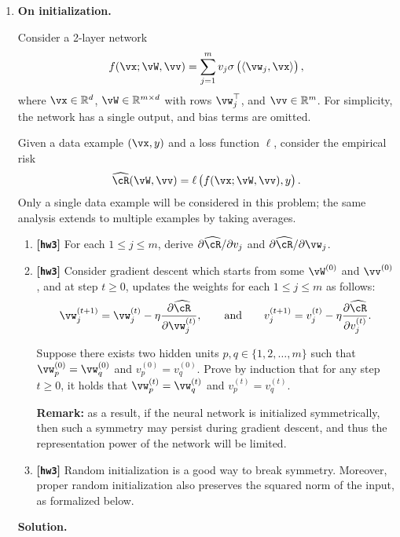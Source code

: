 \documentclass{article}
\def\hcR{\widehat{\cR}}
\def\hw{\textbf{[\texttt{hw3}]}\xspace}
\theoremstyle{definition}
\theoremstyle{remark}
\newenvironment{Q}
{%
\clearpage
\item
}
{%
\phantom{s}%
\bigskip%
\noindent\textbf{Solution.}
}
\begin{document}
\begin{enumerate}[font={\Large\bfseries},leftmargin=0pt]

\begin{Q}
    \textbf{On initialization.}

    Consider a 2-layer network
    \begin{align*}
        f(\vx;\vW,\vv)=\sum_{j=1}^{m}v_j\sigma\del{\langle\vw_j,\vx\rangle},
    \end{align*}
    where $\vx\in \mathbb{R}^d$, $\vW\in \mathbb{R}^{m\times d}$ with rows $\vw_j^\top$, and $\vv\in \mathbb{R}^m$. For simplicity, the network has a single output, and bias terms are omitted.

    Given a data example $(\vx,y)$ and a loss function $\ell$, consider the empirical risk
    \begin{align*}
        \hcR(\vW,\vv)=\ell\del{f(\vx;\vW,\vv),y}.
    \end{align*}
    Only a single data example will be considered in this problem;
    the same analysis extends to multiple examples by taking averages.

    \begin{enumerate}
        \item \hw For each $1\le j\le m$, derive $\partial\hcR/\partial v_j$ and $\partial\hcR/\partial \vw_j$.

        \item \hw Consider gradient descent which starts from some $\vW^{(0)}$ and $\vv^{(0)}$, and at step $t\ge0$, updates the weights for each $1\le j\le m$ as follows:
        \begin{align*}
            \vw_j^{(t+1)}=\vw_j^{(t)}-\eta \frac{\partial\hcR}{\partial \vw_j^{(t)}},\qquad \mathrm{and}\qquad v_j^{(t+1)}=v_j^{(t)}-\eta \frac{\partial\hcR}{\partial v_j^{(t)}}.
        \end{align*}

        Suppose there exists two hidden units $p,q\in\{1,2,\ldots,m\}$ such that $\vw_p^{(0)}=\vw_q^{(0)}$ and $v_p^{(0)}=v_q^{(0)}$. Prove by induction that for any step $t\ge0$, it holds that $\vw_p^{(t)}=\vw_q^{(t)}$ and $v_p^{(t)}=v_q^{(t)}$.

        \textbf{Remark:} as a result, if the neural network is initialized symmetrically, then such a symmetry may persist during gradient descent, and thus the representation power of the network will be limited.

        \item \hw Random initialization is a good way to break symmetry. Moreover, proper random initialization also preserves the squared norm of the input, as formalized below.


\end{enumerate}
\end{Q}
\end{enumerate}
\end{document}
